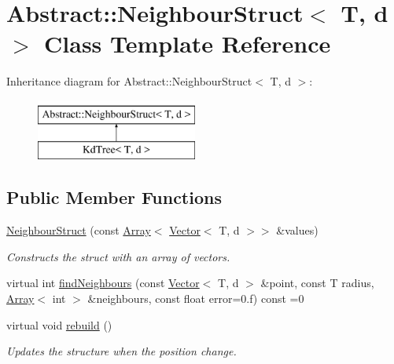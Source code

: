 \hypertarget{classAbstract_1_1NeighbourStruct}{}\section{Abstract\+:\+:Neighbour\+Struct$<$ T, d $>$ Class Template Reference}
\label{classAbstract_1_1NeighbourStruct}
Inheritance diagram for Abstract\+:\+:Neighbour\+Struct$<$ T, d $>$\+:\begin{figure}[H]
\begin{center}
\leavevmode
\includegraphics[height=2.000000cm]{classAbstract_1_1NeighbourStruct}
\end{center}
\end{figure}
\subsection*{Public Member Functions}
\begin{DoxyCompactItemize}
\item 
\hypertarget{classAbstract_1_1NeighbourStruct_ab8f8a374c397dac40ba7cd5acd43de52}{}\label{classAbstract_1_1NeighbourStruct_ab8f8a374c397dac40ba7cd5acd43de52} 
\hyperlink{classAbstract_1_1NeighbourStruct_ab8f8a374c397dac40ba7cd5acd43de52}{Neighbour\+Struct} (const \hyperlink{classArray}{Array}$<$ \hyperlink{classVector}{Vector}$<$ T, d $>$$>$ \&values)
\begin{DoxyCompactList}\small\item\em Constructs the struct with an array of vectors. \end{DoxyCompactList}\item 
virtual int \hyperlink{classAbstract_1_1NeighbourStruct_a53e8c28e6dc34e266e4d1e81afb9d12e}{find\+Neighbours} (const \hyperlink{classVector}{Vector}$<$ T, d $>$ \&point, const T radius, \hyperlink{classArray}{Array}$<$ int $>$ \&neighbours, const float error=0.f) const =0
\item 
\hypertarget{classAbstract_1_1NeighbourStruct_a70391827c0d8c3a36f7fb680dbe5e744}{}\label{classAbstract_1_1NeighbourStruct_a70391827c0d8c3a36f7fb680dbe5e744} 
virtual void \hyperlink{classAbstract_1_1NeighbourStruct_a70391827c0d8c3a36f7fb680dbe5e744}{rebuild} ()
\begin{DoxyCompactList}\small\item\em Updates the structure when the position change. \end{DoxyCompactList}\end{DoxyCompactItemize}
